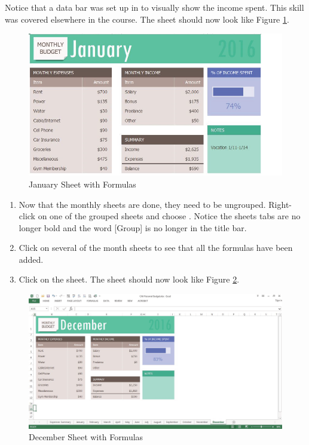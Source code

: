 Notice that a data bar was set up in  to visually show the income spent. This skill was covered elsewhere in the course. The  sheet should now look like Figure \ref{06:fig05}.

\begin{figure}[H]
	\centering
	\includegraphics[width=\maxwidth{.95\linewidth}]{gfx/ch06_fig05}
	\caption{January Sheet with Formulas}
	\label{06:fig05}
\end{figure}

\begin{enumerate}[resume]
	\item Now that the monthly sheets are done, they need to be ungrouped. Right-click on one of the grouped sheets and choose . Notice the sheets tabs are no longer bold and the word [Group] is no longer in the title bar.
	\item Click on several of the month sheets to see that all the formulas have been added.
	\item Click on the  sheet. The sheet should now look like Figure \ref{06:fig06}.
\end{enumerate}

\begin{figure}[H]
	\centering
	\includegraphics[width=\maxwidth{.95\linewidth}]{gfx/ch06_fig06}
	\caption{December Sheet with Formulas}
	\label{06:fig06}
\end{figure}

